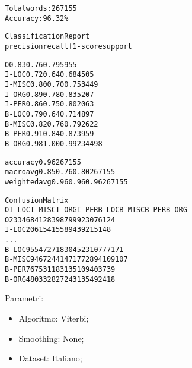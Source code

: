 \begin{alltt}
Total words: 267155
Accuracy: 96.32\%

Classification Report
              precision    recall  f1-score   support

           O       0.83      0.76      0.79      5955
       I-LOC       0.72      0.64      0.68      4505
      I-MISC       0.80      0.70      0.75      3449
       I-ORG       0.89      0.78      0.83      5207
       I-PER       0.86      0.75      0.80      2063
       B-LOC       0.79      0.64      0.71      4897
      B-MISC       0.82      0.76      0.79      2622
       B-PER       0.91      0.84      0.87      3959
       B-ORG       0.98      1.00      0.99    234498

    accuracy                           0.96    267155
   macro avg       0.85      0.76      0.80    267155
weighted avg       0.96      0.96      0.96    267155


Confusion Matrix
             O  I-LOC  I-MISC  I-ORG  I-PER  B-LOC  B-MISC  B-PER  B-ORG
O       233468     41     283     98     79     99     230     76    124
I-LOC      206   1541      55     89     43     92      15     14      8
...
B-LOC      955     47      27     18     30   4523     107     77    171
B-MISC     946      7     244     14      7    177    2894    109    107
B-PER      767      5      31      1     83    135     109   4037     39
B-ORG      480      3      32     82      7    243     135     49   2418
\end{alltt}
\newpage
\noindent Parametri:
\begin{itemize}
 \item Algoritmo: Viterbi;
 \item Smoothing: None;
 \item Dataset: Italiano;
\end{itemize}

